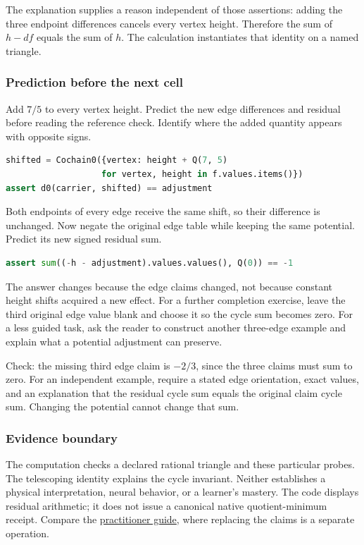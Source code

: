 \documentclass[
  11pt,
]{article}
\begin{document}
The explanation supplies a reason independent of those assertions:
adding the three endpoint differences cancels every vertex height.
Therefore the sum of \(h-df\) equals the sum of \(h\). The calculation
instantiates that identity on a named triangle.

\subsubsection{Prediction before the next
cell}\label{prediction-before-the-next-cell}

Add \(7/5\) to every vertex height. Predict the new edge differences and
residual before reading the reference check. Identify where the added
quantity appears with opposite signs.

\begin{lstlisting}[language=Python]
shifted = Cochain0({vertex: height + Q(7, 5)
                   for vertex, height in f.values.items()})
assert d0(carrier, shifted) == adjustment
\end{lstlisting}

Both endpoints of every edge receive the same shift, so their difference
is unchanged. Now negate the original edge table while keeping the same
potential. Predict its new signed residual sum.

\begin{lstlisting}[language=Python]
assert sum((-h - adjustment).values.values(), Q(0)) == -1
\end{lstlisting}

The answer changes because the edge claims changed, not because constant
height shifts acquired a new effect. For a further completion exercise,
leave the third original edge value blank and choose it so the cycle sum
becomes zero. For a less guided task, ask the reader to construct
another three-edge example and explain what a potential adjustment can
preserve.

Check: the missing third edge claim is \(-2/3\), since the three claims
must sum to zero. For an independent example, require a stated edge
orientation, exact values, and an explanation that the residual cycle
sum equals the original claim cycle sum. Changing the potential cannot
change that sum.

\subsubsection{Evidence boundary}\label{evidence-boundary}

The computation checks a declared rational triangle and these particular
probes. The telescoping identity explains the cycle invariant. Neither
establishes a physical interpretation, neural behavior, or a learner's
mastery. The code displays residual arithmetic; it does not issue a
canonical native quotient-minimum receipt. Compare the
\href{../005/paper.pdf}{practitioner guide}, where replacing the claims
is a separate operation.
\end{document}
